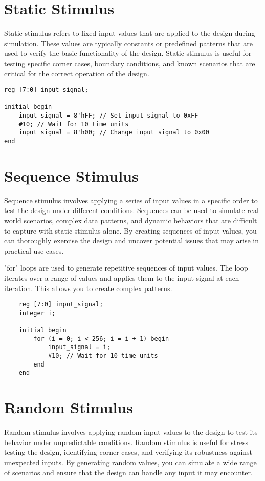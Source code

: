 \documentclass{report}
\begin{document}
\section{Static Stimulus}
Static stimulus refers to fixed input values that are applied to the design during simulation. These values are typically constants or predefined patterns that are used to verify the basic functionality of the design. Static stimulus is useful for testing specific corner cases, boundary conditions, and known scenarios that are critical for the correct operation of the design.
\begin{verbatim}
reg [7:0] input_signal;

initial begin
    input_signal = 8'hFF; // Set input_signal to 0xFF
    #10; // Wait for 10 time units
    input_signal = 8'h00; // Change input_signal to 0x00
end
\end{verbatim}
\section{Sequence Stimulus}
Sequence stimulus involves applying a series of input values in a specific order to test the design under different conditions. Sequences can be used to simulate real-world scenarios, complex data patterns, and dynamic behaviors that are difficult to capture with static stimulus alone. By creating sequences of input values, you can thoroughly exercise the design and uncover potential issues that may arise in practical use cases.

"for" loops are used to generate repetitive sequences of input values. The loop iterates over a range of values and applies them to the input signal at each iteration. This allows you to create complex patterns.
\begin{verbatim}
    reg [7:0] input_signal;
    integer i;
    
    initial begin
        for (i = 0; i < 256; i = i + 1) begin
            input_signal = i;
            #10; // Wait for 10 time units
        end
    end
\end{verbatim}
\section{Random Stimulus}
Random stimulus involves applying random input values to the design to test its behavior under unpredictable conditions. Random stimulus is useful for stress testing the design, identifying corner cases, and verifying its robustness against unexpected inputs. By generating random values, you can simulate a wide range of scenarios and ensure that the design can handle any input it may encounter.
\end{document}
